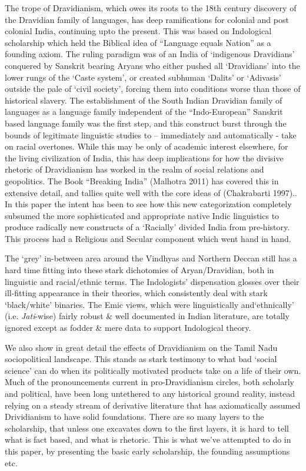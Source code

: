 The trope of Dravidianism, which owes its roots to the 18th century discovery of the Dravidian family of languages, has deep ramifications for colonial and post colonial India, continuing upto the present. This was based on Indological scholarship which held the Biblical idea of “Language equals Nation” as a founding axiom. The ruling paradigm was of an India of ‘indigenous Dravidians’ conquered by Sanskrit bearing Aryans who either pushed all ‘Dravidians’ into the lower rungs of the ‘Caste system’, or created subhuman ‘Dalits’ or ‘Adivasis’ outside the pale of ‘civil society’, forcing them into conditions worse than those of historical slavery. The establishment of the South Indian Dravidian family of languages as a language family independent of the “Indo-European” Sanskrit based language family was the first step, and this construct burst through the bounds of legitimate linguistic studies to – immediately and automatically - take on racial overtones. While this may be only of academic interest elsewhere, for the living civilization of India, this has deep implications for how the divisive rhetoric of Dravidianism has worked in the realm of social relations and geopolitics. The Book “Breaking India” (Malhotra 2011) has covered this in extensive detail, and tallies quite well with the core ideas of (Chakrabarti 1997).. In this paper the intent has been to see how this new categorization completely subsumed the more sophisticated and appropriate native Indic linguistics to produce radically new constructs of a ‘Racially’ divided India from pre-history. This process had a Religious and Secular component which went hand in hand.

The ‘grey’ in-between area around the Vindhyas and Northern Deccan still has a hard time fitting into these stark dichotomies of Aryan/Dravidian, both in linguistic and racial/ethnic terms. The Indologists’ dispensation glosses over their ill-fitting appearance in their theories, which consistently deal with stark ‘black/white’ binaries. The Emic views, which were linguistically and‘ethnically’ (i.e. \textit{Jati}-wise) fairly robust \& well documented in Indian literature, are totally ignored except as fodder \& mere data to support Indological theory.

We also show in great detail the effects of Dravidianism on the Tamil Nadu sociopolitical landscape. This stands as stark testimony to what bad ‘social science’ can do when its politically motivated products take on a life of their own. Much of the pronouncements current in pro-Dravidianism circles, both scholarly and political, have been long untethered to any historical ground reality, instead relying on a steady stream of derivative literature that has axiomatically assumed Drividianism to have solid foundations. There are so many layers to the scholarship, that unless one excavates down to the first layers, it is hard to tell what is fact based, and what is rhetoric. This is what we’ve attempted to do in this paper, by presenting the basic early scholarship, the founding assumptions etc.

